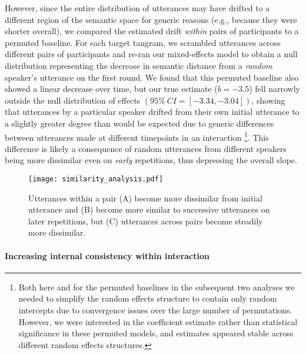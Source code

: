However, since the entire distribution of utterances may have drifted to a different region of the semantic space for generic reasons (e.g., because they were shorter overall), we compared the estimated drift \emph{within} pairs of participants to a permuted baseline.
For each target tangram, we scrambled utterances across different pairs of participants and re-ran our mixed-effects model to obtain a null distribution representing the decrease in semantic distance from a \emph{random} speaker's utterance on the first round.
We found that this permuted baseline also showed a linear decrease over time, but our true estimate ($b=-3.5$) fell narrowly outside the null distribution of effects $(95\%~CI= [-3.34, -3.04])$, showing that utterances by a particular speaker drifted from their own initial utterance to a slightly greater degree than would be expected due to generic differences between utterances made at different timepoints in an interaction \footnote{Both here and for the permuted baselines in the subsequent two analyses we needed to simplify the random effects structure to contain only random intercepts due to convergence issues over the large number of permutations. However, we were interested in the coefficient estimate rather than statistical significance in these permuted models, and estimates appeared stable across different random effects structures.}.
This difference is likely a consequence of random utterances from different speakers being more dissimilar even on \emph{early} repetitions, thus depressing the overall slope.

\begin{figure}
\texttt{[image: similarity\_analysis.pdf]}
\caption{Utterances within a pair (A) become more dissimilar from initial utterance and (B) become more similar to successive utterances on later repetitions, but (C) utterances across pairs become steadily more dissimilar.}
\label{fig:similarity}
\end{figure}

\paragraph{Increasing internal consistency within interaction}


